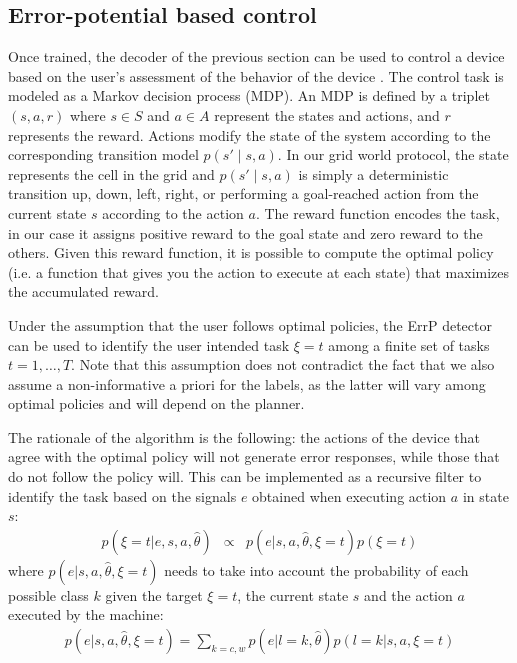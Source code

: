 \subsection{Error-potential based control}
\label{sec:errpcontrol}
Once trained, the decoder of the previous section can be used to control a device based on the user's assessment of the behavior of the device \cite{iturrate13}. 
%
The control task is modeled as a Markov decision process (MDP). An MDP is defined by a triplet $(s,a,r)$  where $s\in S$ and $a\in A$ represent the states and actions, and $r$ represents the reward.  Actions modify the state of the system according to the corresponding transition model $p(s'\mid s,a)$. In our grid world protocol, the state represents the cell in the grid and  $p(s'\mid s,a)$ is simply a deterministic transition up, down, left, right, or performing a goal-reached action from the current state $s$ according to the action $a$. The reward function encodes the task, in our case it assigns positive reward to the goal state and zero reward to the others. Given this reward function, it is possible to compute the optimal policy (i.e. a function that gives you the action to execute at each state) that maximizes the accumulated reward. 

Under the assumption that the user follows optimal policies, the ErrP detector can be used to identify the user intended task $\xi = t$ among a finite set of tasks $t = 1,\ldots,T$. Note that this assumption does not contradict the fact that we also assume a non-informative a priori for the labels, as the latter will vary among optimal policies and will depend on the planner.

The rationale of the algorithm is the following: the actions of the device that agree with the optimal policy will not generate error responses, while those that do not follow the policy will. This can be implemented as a recursive filter to identify the task based on the signals $e$ obtained when executing action $a$ in state $s$:
%
\begin{eqnarray}
p(\xi=t|e, s, a, \hat{\theta}) & \propto & p(e |s, a, \hat{\theta}, \xi=t) p(\xi=t)
\label{eq:1}
\end{eqnarray}
%
where  $p(e |s, a, \hat{\theta}, \xi=t)$ needs to take into account the probability of each possible class $k$ given the target $\xi=t$, the current state $s$ and the action $a$ executed by the machine:
%
\begin{eqnarray}
p(e |s, a, \hat{\theta}, \xi=t) =  \sum_{k = c,w} p(e |l = k, \hat{\theta}) p(l = k| s, a, \xi=t)
\label{eq:2}
\end{eqnarray}

